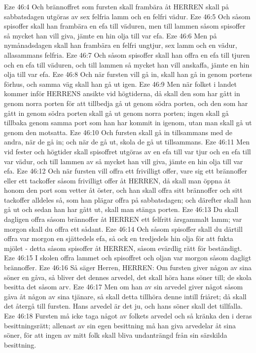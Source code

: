 Eze 46:4  Och brännoffret som fursten skall frambära åt HERREN skall på sabbatsdagen utgöras av sex felfria lamm och en felfri vädur.
Eze 46:5  Och såsom spisoffer skall han frambära en efa till väduren, men till lammen såsom spisoffer så mycket han vill giva, jämte en hin olja till var efa.
Eze 46:6  Men på nymånadsdagen skall han frambära en felfri ungtjur, sex lamm och en vädur, allasammans felfria.
Eze 46:7  Och såsom spisoffer skall han offra en efa till tjuren och en efa till väduren, och till lammen så mycket han vill anskaffa, jämte en hin olja till var efa.
Eze 46:8  Och när fursten vill gå in, skall han gå in genom portens förhus, och samma väg skall han gå ut igen.
Eze 46:9  Men när folket i landet kommer inför HERRENS ansikte vid högtiderna, då skall den som har gått in genom norra porten för att tillbedja gå ut genom södra porten, och den som har gått in genom södra porten skall gå ut genom norra porten; ingen skall gå tillbaka genom samma port som han har kommit in igenom, utan man skall gå ut genom den motsatta.
Eze 46:10  Och fursten skall gå in tillsammans med de andra, när de gå in; och när de gå ut, skola de gå ut tillsammans.
Eze 46:11  Men vid fester och högtider skall spisoffret utgöras av en efa till var tjur och en efa till var vädur, och till lammen av så mycket han vill giva, jämte en hin olja till var efa.
Eze 46:12  Och när fursten vill offra ett frivilligt offer, vare sig ett brännoffer eller ett tackoffer såsom frivilligt offer åt HERREN, då skall man öppna åt honom den port som vetter åt öster, och han skall offra sitt brännoffer och sitt tackoffer alldeles så, som han plägar offra på sabbatsdagen; och därefter skall han gå ut och sedan han har gått ut, skall man stänga porten.
Eze 46:13  Du skall dagligen offra såsom brännoffer åt HERREN ett felfritt årsgammalt lamm; var morgon skall du offra ett sådant.
Eze 46:14  Och såsom spisoffer skall du därtill offra var morgon en sjättedels efa, så ock en tredjedels hin olja för att fukta mjölet - detta såsom spisoffer åt HERREN, såsom evärdlig rätt för beständigt.
Eze 46:15  I skolen offra lammet och spisoffret och oljan var morgon såsom dagligt brännoffer.
Eze 46:16  Så säger Herren, HERREN: Om fursten giver någon av sina söner en gåva, så bliver det dennes arvedel, det skall höra hans söner till; de skola besitta det såsom arv.
Eze 46:17  Men om han av sin arvedel giver något såsom gåva åt någon av sina tjänare, så skall detta tillhöra denne intill friåret; då skall det återgå till fursten. Hans arvedel är det ju, och hans söner skall det tillfalla.
Eze 46:18  Fursten må icke taga något av folkets arvedel och så kränka den i deras besittningsrätt; allenast av sin egen besittning må han giva arvedelar åt sina söner, för att ingen av mitt folk skall bliva undanträngd från sin särskilda besittning.
